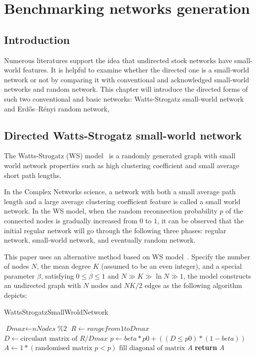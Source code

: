 \chapter{Benchmarking networks generation}
\section{Introduction}
Numerous literatures support the idea that undirected stock networks have small-world features. It is helpful to examine whether the directed one is a small-world network or not by comparing it with conventional and acknowledged small-world networks and random network. This chapter will introduce the directed forms of such two conventional and basic networks: Watts-Strogatz small-world network and Erdős–Rényi random network, 

\section{Directed Watts-Strogatz small-world network}
The Watts-Strogatz (WS) model~\cite{watts1998collective} is a randomly generated graph with small world network properties such as high clustering coefficient and small average short path lengths.

In the Complex Networks science, a network with both a small average path length and a large average clustering coefficient feature is called a small world network. In the WS model, when the random reconnection probability $p$ of the connected nodes is gradually increased from $0$ to $1$, it can be observed that the initial regular network will go through the following three phases: regular network, small-world network, and eventually random network.

This paper uses an alternative method based on WS model~\cite{song2014simple}. Specify the number of nodes $N$, the mean degree $K$ (assumed to be an even integer), and a special parameter $\beta$, satisfying $0\leq \beta \leq 1$ and $N\gg K\gg \ln N\gg 1$, the model constructs an undirected graph with $N$ nodes and ${NK}/{2}$ edges as the following algorithm depicts:

\begin{algorithm}[H]
	\caption{WattsStrogatzSmallWroldNetwork}\label{alg:smallworld}
	\begin{algorithmic}[1]
		\State $\textit{Dmax} \gets \textit{nNodes \% 2}$
		\State $\textit{R} \gets range from 1 to \textit{Dmax}$
		\State $\textit{D} \gets \text{circulant matrix of } \textit{R}/\textit{Dmax}$
		\State $\textit{p} \gets \textit{beta}*\textit{p0}+((\textit{D} \leq \textit{p0})*(1-\textit{beta}))$
		\State $\textit{A} \gets 1*(\text{randomised matrix }\textit{p} < p)$
		\State $\text{fill diagonal of matrix }\textit{A}$
		\State \textbf{return} {\textit{A}}
		\EndProcedure
	\end{algorithmic}
\end{algorithm}

